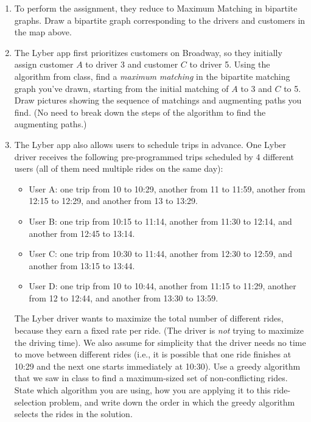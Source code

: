 \documentclass[11pt]{article}
\begin{document}
\begin{enumerate}
    \begin{enumerate}
    \item To perform the assignment, they reduce to Maximum Matching in bipartite graphs.  Draw a bipartite graph corresponding to the drivers and customers in the map above.

    
    \item The Lyber app first prioritizes customers on Broadway, so they initially assign customer $A$ to driver 3 and customer $C$ to driver 5. Using the algorithm from class, find a \textit{maximum matching} in the bipartite matching graph you've drawn, starting from the initial matching of $A$ to 3 and $C$ to 5. Draw pictures showing the sequence of matchings and augmenting paths you find. (No need to break down the steps of the algorithm to find the augmenting paths.)


    \item The Lyber app also allows users to schedule trips in advance. One Lyber driver receives the following pre-programmed trips scheduled by 4 different users (all of them need multiple rides on the same day):
    \begin{itemize}
        \item User A: one trip from 10 to 10:29, another from 11 to 11:59, another from 12:15 to 12:29, and another from 13 to 13:29.
        \item User B: one trip from 10:15 to 11:14, another from 11:30 to 12:14, and another from 12:45 to 13:14.
        \item User C: one trip from 10:30 to 11:44, another from 12:30 to 12:59, and another from 13:15 to 13:44.
        \item User D: one trip from 10 to 10:44, another from 11:15 to 11:29, another from 12 to 12:44, and another from 13:30 to 13:59.
    \end{itemize}
    The Lyber driver wants to maximize the total number of different rides, because they earn a fixed rate per ride. (The driver is \textit{not} trying to maximize the driving time). 
    We also assume for simplicity that the driver needs no time to move between different rides (i.e., it is possible that one ride finishes at 10:29 and the next one starts immediately at 10:30). 
    Use a greedy algorithm that we saw in class to find a maximum-sized set of non-conflicting rides.  State which algorithm you are using, how you are applying it to this ride-selection problem, and write down the order in which the greedy algorithm selects the rides in the solution. 
    

\end{enumerate}
\end{enumerate}
\end{document}

